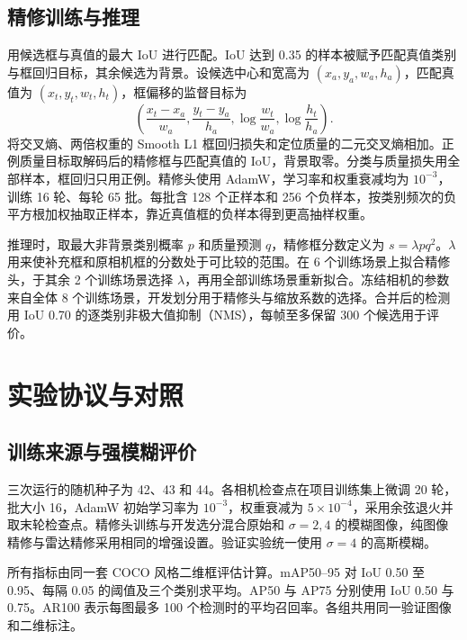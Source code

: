 \documentclass[conference,10pt,a4paper]{IEEEtran}
\begin{document}
\subsection{精修训练与推理}
用候选框与真值的最大 IoU 进行匹配。IoU 达到 0.35 的样本被赋予匹配真值类别与框回归目标，其余候选为背景。设候选中心和宽高为 $(x_a,y_a,w_a,h_a)$，匹配真值为 $(x_t,y_t,w_t,h_t)$，框偏移的监督目标为
\begin{equation}
 \left(\frac{x_t-x_a}{w_a},\frac{y_t-y_a}{h_a},
 \log\frac{w_t}{w_a},\log\frac{h_t}{h_a}\right).
\end{equation}
将交叉熵、两倍权重的 Smooth L1 框回归损失和定位质量的二元交叉熵相加。正例质量目标取解码后的精修框与匹配真值的 IoU，背景取零。分类与质量损失用全部样本，框回归只用正例。精修头使用 AdamW，学习率和权重衰减均为 $10^{-3}$，训练 16 轮、每轮 65 批。每批含 128 个正样本和 256 个负样本，按类别频次的负平方根加权抽取正样本，靠近真值框的负样本得到更高抽样权重。

推理时，取最大非背景类别概率 $p$ 和质量预测 $q$，精修框分数定义为 $s=\lambda p q^2$。$\lambda$ 用来使补充框和原相机框的分数处于可比较的范围。在 6 个训练场景上拟合精修头，于其余 2 个训练场景选择 $\lambda$，再用全部训练场景重新拟合。冻结相机的参数来自全体 8 个训练场景，开发划分用于精修头与缩放系数的选择。合并后的检测用 IoU 0.70 的逐类别非极大值抑制（NMS），每帧至多保留 300 个候选用于评价。

\section{实验协议与对照}
\subsection{训练来源与强模糊评价}
三次运行的随机种子为 42、43 和 44。各相机检查点在项目训练集上微调 20 轮，批大小 16，AdamW 初始学习率为 $10^{-3}$，权重衰减为 $5\times10^{-4}$，采用余弦退火并取末轮检查点。精修头训练与开发选分混合原始和 $\sigma=2,4$ 的模糊图像，纯图像精修与雷达精修采用相同的增强设置。验证实验统一使用 $\sigma=4$ 的高斯模糊。

所有指标由同一套 COCO 风格二维框评估计算\cite{coco}。mAP50--95 对 IoU 0.50 至 0.95、每隔 0.05 的阈值及三个类别求平均。AP50 与 AP75 分别使用 IoU 0.50 与 0.75。AR100 表示每图最多 100 个检测时的平均召回率。各组共用同一验证图像和二维标注。
\end{document}

